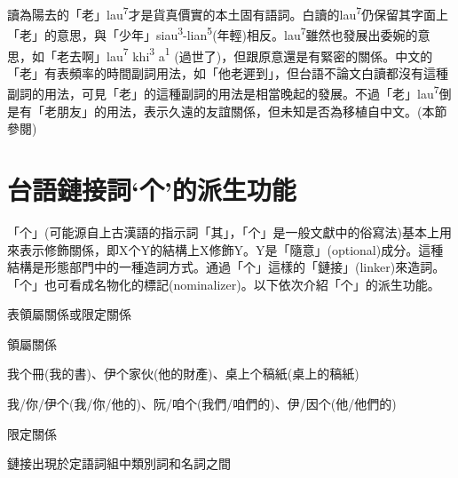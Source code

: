 \textrm{讀為陽去的「老」lau}\textrm{\textsuperscript{7}}\textrm{才是貨真價實的本土固有語詞。白讀的lau}\textrm{\textsuperscript{7}}\textrm{仍保留其字面上「老」的意思，與「少年」siau}\textrm{\textsuperscript{3}}\textrm{{}-lian}\textrm{\textsuperscript{5}}\textrm{(年輕)相反。lau}\textrm{\textsuperscript{7}}\textrm{雖然也發展出委婉的意思，如「老去啊」lau}\textrm{\textsuperscript{7}} \textrm{khi}\textrm{\textsuperscript{3}} \textrm{a}\textrm{\textsuperscript{1} }\textrm{(過世了)}，\textrm{但跟原意還是有緊密的關係。中文的「老」有表頻率的時間副詞用法，如「他老遲到」，但台語不論文白讀都沒有這種副詞的用法，可見「老」的這種副詞的用法是相當晚起的發展。不過「老」lau}\textrm{\textsuperscript{7}}\textrm{倒是有「老朋友」的用法，表示久遠的友誼關係，但未知是否為移植自中文。(本節參閱\citealt{Lien2001})}

\section{\rmfamily 台語鏈接詞‘个’的派生功能}

\textrm{「个」(可能源自上古漢語的指示詞「其」，「个」是一般文獻中的俗寫法)基本上用來表示修飾關係，即X个Y的結構上X修飾Y}。\textrm{Y是「隨意」(optional)成分。這種結構是形態部門中的一種造詞方式。通過「个」這樣的「鏈接」(linker)來造詞。「个」也可看成名物化的標記(nominalizer)。以下依次介紹「个」的派生功能。}

\begin{listWWviiiNumxivleveli}
\item \begin{styleqwerty}\rmfamily
表領屬關係或限定關係
\end{styleqwerty}
\end{listWWviiiNumxivleveli}

\begin{listWWviiiNumxxleveli}
\item \begin{styleqwerty}\rmfamily
領屬關係
\end{styleqwerty}
\end{listWWviiiNumxxleveli}

\textrm{我个冊(我的書)}、\textrm{伊个家伙(他的財產)}、\textrm{桌上个稿紙(桌上的稿紙)}

\textrm{我/你/伊个(我/你/他的)}、\textrm{阮/咱个(我們/咱們的)}、\textrm{伊/因个(他/他們的)}

\begin{listWWviiiNumxxleveli}
\item \begin{styleqwerty}\rmfamily
限定關係
\end{styleqwerty}
\end{listWWviiiNumxxleveli}
\rmfamily
鏈接出現於定語詞組中類別詞和名詞之間

